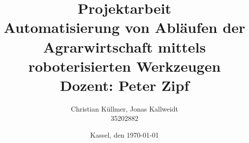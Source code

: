 \documentclass[a4paper,12pt,titlepage]{article}
\begin{document}
\title{{\textsf{Projektarbeit\\
	\glqq Automatisierung von Abläufen der Agrarwirtschaft mittels roboterisierten Werkzeugen\grqq \\
	\vspace{1ex}
	Dozent: Peter Zipf}}}
\author{Christian Küllmer, Jonas Kallweidt\\
	35202882}
\date{Kassel, den \today}

\maketitle       %
\tableofcontents %
\listoffigures   %
\listoftables    %


\end{document}
